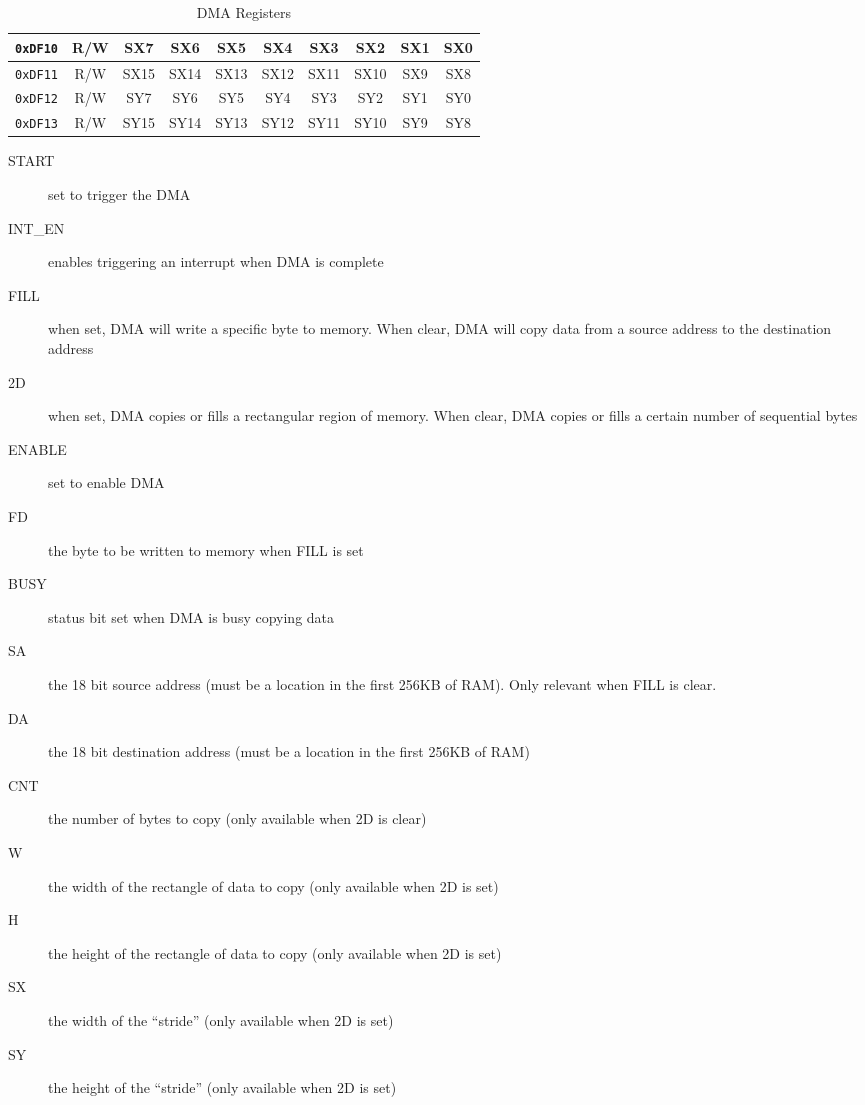 \begin{table}[ht]
\begin{center}
\begin{tabular}{|c|c|c|c|c|c|c|c|c|c|}
            \verb+0xDF10+ & R/W & SX7 & SX6 & SX5 & SX4 & SX3 & SX2 & SX1 & SX0 \\ \hline
            \verb+0xDF11+ & R/W & SX15 & SX14 & SX13 & SX12 & SX11 & SX10 & SX9 & SX8 \\ \hline

            \verb+0xDF12+ & R/W & SY7 & SY6 & SY5 & SY4 & SY3 & SY2 & SY1 & SY0 \\ \hline
            \verb+0xDF13+ & R/W & SY15 & SY14 & SY13 & SY12 & SY11 & SY10 & SY9 & SY8 \\ \hline
        \end{tabular}
    \end{center}
    \caption{DMA Registers}
    \label{tab:dma_reg}
\end{table}

\begin{description}
    \item[START] set to trigger the DMA

    \item[INT\_EN] enables triggering an interrupt when DMA is complete

    \item[FILL] when set, DMA will write a specific byte to memory. When clear, DMA will copy data from a source address to the destination address

    \item[2D] when set, DMA copies or fills a rectangular region of memory. When clear, DMA copies or fills a certain number of sequential bytes

    \item[ENABLE] set to enable DMA

    \item[FD] the byte to be written to memory when FILL is set

    \item[BUSY] status bit set when DMA is busy copying data

    \item[SA] the 18 bit source address (must be a location in the first 256KB of RAM). Only relevant when FILL is clear.

    \item[DA] the 18 bit destination address (must be a location in the first 256KB of RAM)

    \item[CNT] the number of bytes to copy (only available when 2D is clear)

    \item[W] the width of the rectangle of data to copy (only available when 2D is set)

    \item[H] the height of the rectangle of data to copy (only available when 2D is set)

    \item[SX] the width of the ``stride'' (only available when 2D is set)

    \item[SY] the height of the ``stride'' (only available when 2D is set)
\end{description}
